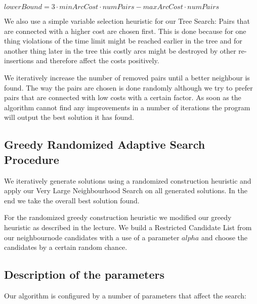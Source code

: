 \documentclass[a4paper]{scrartcl}
\begin{document}
$lowerBound = 3 \cdot minArcCost \cdot numPairs - maxArcCost \cdot numPairs $



We also use a simple variable selection heuristic for our Tree Search: Pairs that are connected with a higher cost are chosen first. This is done because for one thing violations of the time limit might be reached earlier in the tree and for another thing later in the tree this costly arcs might be destroyed by other re-insertions and therefore affect the costs positively.

We iteratively increase the number of removed pairs until a better neighbour is found. The way the pairs are chosen is done randomly although we try to prefer pairs that are connected with low costs with a certain factor. As soon as the algorithm cannot find any improvements in a number of iterations the program will output the best solution it has found.

\subsection{Greedy Randomized Adaptive Search Procedure}
We iteratively generate solutions using a randomized construction heuristic and apply our Very Large Neighbourhood Search on all generated solutions. In the end we take the overall best solution found.

For the randomized greedy construction heuristic we modified our greedy heuristic as described in the lecture. We build a Restricted Candidate List from our neighbournode candidates with a use of a parameter $alpha$ and choose the candidates by a certain random chance.

\subsection{Description of the parameters}
Our algorithm is configured by a number of parameters that affect the search:
\end{document}
